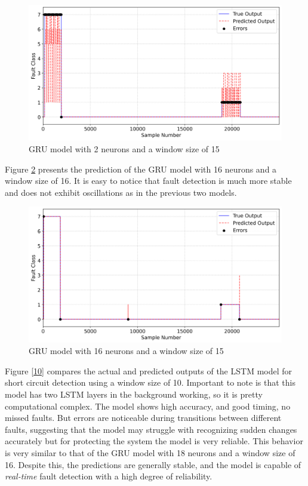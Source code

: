 \documentclass[11pt]{IEEEtran}
\begin{document}
\begin{figure}[H]
    \centering
    \includegraphics[width=1\linewidth]{figs/true_vs_predicted_gru_ekstra_minimum_model_window_size_15.png}
    \caption{GRU model with 2 neurons and a window size of 15}
    \label{fig:ekstra_minimum}
\end{figure}
Figure \ref{fig:4} presents the prediction of the GRU model with 16 neurons and a window size of 16. It is easy to notice that fault detection is much more stable and does not exhibit oscillations as in the previous two models.

\begin{figure}[H]
    \centering
    \includegraphics[width=1\linewidth]{figs/true_vs_predicted_gru_model_window_size_15.png}
    \caption{GRU model with 16 neurons and a window size of 15}
    \label{fig:4}
\end{figure}
Figure \ref{10} compares the actual and predicted outputs of the LSTM model for short circuit detection using a window size of 10. Important to note is that this model has two LSTM layers in the background working, so it is pretty computational complex. The model shows high accuracy, and good timing, no missed faults. But errors are noticeable during transitions between different faults, suggesting that the model may struggle with recognizing sudden changes accurately but for protecting the system the model is very reliable. This behavior is very similar to that of the GRU model with 18 neurons and a window size of 16. Despite this, the predictions are generally stable, and the model is capable of \textit{real-time} fault detection with a high degree of reliability.
\end{document}
